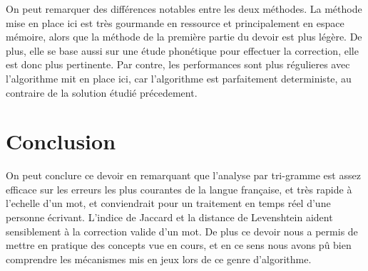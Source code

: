\documentclass[french,12pt,a4]{report}
\begin{document}
On peut remarquer des différences notables entre les deux méthodes. La
méthode mise en place ici est très gourmande en ressource et
principalement en espace mémoire, alors que la méthode de la première
partie du devoir est plus légère. De plus, elle se base aussi sur une
étude phonétique pour effectuer la correction, elle est donc plus pertinente.
Par contre, les performances sont plus régulieres avec l'algorithme mit
en place ici, car l'algorithme est parfaitement deterministe, au
contraire de la solution étudié précedement.

\chapter{Conclusion}

On peut conclure ce devoir en remarquant que l'analyse par tri-gramme
est assez efficace sur les erreurs les plus courantes de la langue
française, et très rapide à l'echelle d'un mot, et conviendrait pour
un traitement en temps réel d'une personne écrivant. L'indice de Jaccard et la distance de
Levenshtein aident sensiblement à la correction valide d'un mot. De
plus ce devoir nous a permis de mettre en pratique des concepts vue en
cours, et en ce sens nous avons pû bien comprendre les mécanismes mis
en jeux lors de ce genre d'algorithme.
\end{document}
